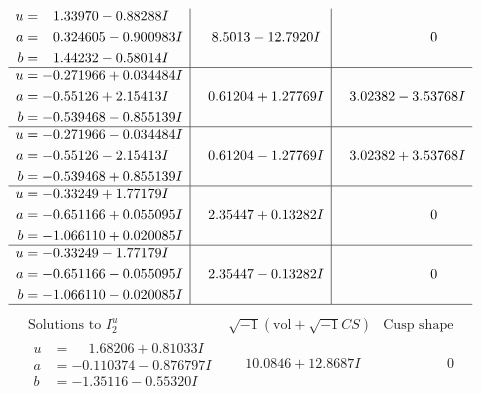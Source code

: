 \documentclass[1p]{elsarticle_modified}
\theoremstyle{definition}
\newcommand{\I}{\sqrt{-1}}
\begin{document}
$$\begin{array}{c|c|c}
\begin{aligned}
u &= \phantom{-}1.33970 - 0.88288 I \\
a &= \phantom{-}0.324605 - 0.900983 I \\
b &= \phantom{-}1.44232 - 0.58014 I\end{aligned}
 & \phantom{-}8.5013 - 12.7920 I & \phantom{-0.000000 } 0 \\ \hline\begin{aligned}
u &= -0.271966 + 0.034484 I \\
a &= -0.55126 + 2.15413 I \\
b &= -0.539468 - 0.855139 I\end{aligned}
 & \phantom{-}0.61204 + 1.27769 I & \phantom{-}3.02382 - 3.53768 I \\ \hline\begin{aligned}
u &= -0.271966 - 0.034484 I \\
a &= -0.55126 - 2.15413 I \\
b &= -0.539468 + 0.855139 I\end{aligned}
 & \phantom{-}0.61204 - 1.27769 I & \phantom{-}3.02382 + 3.53768 I \\ \hline\begin{aligned}
u &= -0.33249 + 1.77179 I \\
a &= -0.651166 + 0.055095 I \\
b &= -1.066110 + 0.020085 I\end{aligned}
 & \phantom{-}2.35447 + 0.13282 I & \phantom{-0.000000 } 0 \\ \hline\begin{aligned}
u &= -0.33249 - 1.77179 I \\
a &= -0.651166 - 0.055095 I \\
b &= -1.066110 - 0.020085 I\end{aligned}
 & \phantom{-}2.35447 - 0.13282 I & \phantom{-0.000000 } 0\\
 \hline 
 \end{array}$$\newpage$$\begin{array}{c|c|c}  
\text{Solutions to }I^u_{2}& \I (\text{vol} + \sqrt{-1}CS) & \text{Cusp shape}\\
 \hline 
\begin{aligned}
u &= \phantom{-}1.68206 + 0.81033 I \\
a &= -0.110374 - 0.876797 I \\
b &= -1.35116 - 0.55320 I\end{aligned}
 & \phantom{-}10.0846 + 12.8687 I & \phantom{-0.000000 } 0 \\ \hline\begin{aligned}

\end{aligned}
\end{array}$$
\end{document}
